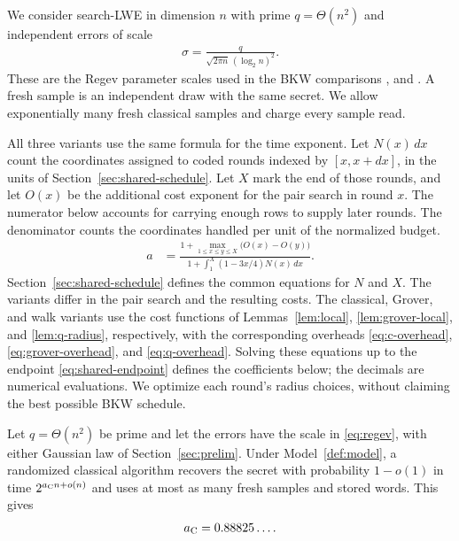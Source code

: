 \documentclass[runningheads,envcountsame,envcountsect,orivec]{llncs}
\begin{document}
We consider search-LWE in dimension $n$ with prime
$q=\Theta(n^2)$ and independent errors of scale
\begin{align}
 \sigma=\frac{q}{\sqrt{2\pi n}\,(\log_2 n)^2}.
 \label{eq:regev}
\end{align}
These are the Regev parameter scales used in the BKW
comparisons \cite{Regev09}, \cite{GJMS19} and \cite{M19}. A fresh sample is
an independent draw with the same secret. We allow
exponentially many fresh classical samples and charge
every sample read.


All three variants use the same formula for the time exponent.
Let $N(x)\,dx$ count the coordinates assigned to coded
rounds indexed by $[x,x+dx]$, in the units of
Section~\ref{sec:shared-schedule}. Let $X$ mark the end of those
rounds, and let $O(x)$ be the additional
cost exponent for the pair search in round $x$. The numerator
below accounts for carrying enough rows to supply later rounds.
The denominator counts the coordinates handled per unit of
the normalized budget.
\begin{align}
 a
 &=\frac{1+\displaystyle\max_{1\le x\le y\le X}\bigl(O(x)-O(y)\bigr)}
         {1+\displaystyle\int_1^X(1-3x/4)N(x)\,dx}.
 \label{eq:main-exponent}
\end{align}
Section~\ref{sec:shared-schedule} defines the common equations
for $N$ and $X$. The variants differ in the pair search
and the resulting costs.
The classical, Grover, and walk variants use the cost functions of
Lemmas~\ref{lem:local}, \ref{lem:grover-local}, and \ref{lem:q-radius},
respectively, with the corresponding overheads
\eqref{eq:c-overhead}, \eqref{eq:grover-overhead}, and \eqref{eq:q-overhead}.
Solving these equations up to the endpoint
\eqref{eq:shared-endpoint} defines the coefficients below;
the decimals are numerical evaluations. We optimize each round's
radius choices, without claiming the best possible BKW schedule.

\begin{theorem}
\label{thm:classical}
Let $q=\Theta(n^2)$ be prime and let the errors have the scale
in \eqref{eq:regev}, with either Gaussian law of
Section~\ref{sec:prelim}. Under Model~\ref{def:model}, a
randomized classical algorithm recovers the secret with
probability $1-o(1)$ in time $2^{a_{\rm C}n+o(n)}$ and uses
at most as many fresh samples and stored words.
This gives
\begin{align}
 a_{\rm C}=0.88825\ldots .
 \label{eq:c-main}
\end{align}
\end{theorem}
\end{document}
